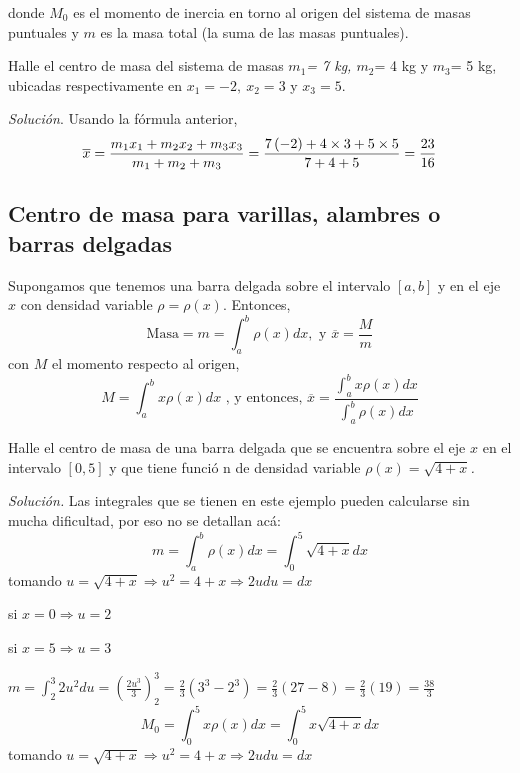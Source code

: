 donde $M_{0}$ es el momento de inercia en torno al origen del sistema de masas puntuales y $m$ es la masa total (la suma de las masas puntuales).


\begin{ejemplo} 
\textnormal{Halle el centro de masa del sistema de masas \textit{$m_{1}$= 7 kg, $m_{2}$}= 4 kg y \textit{$m_{3}$}= 5 kg, ubicadas respectivamente en \textit{$x_{1}=-2,\ x_{2}=3$} y \textit{$x_{3}=5.$}}
\end{ejemplo}


\textit{Solución}. Usando la fórmula anterior,
\[
\overline{x}=\frac{m_{1}x_{1}+m_{2}x_{2}+m_{3}x_{3}}{%
	m_{1}+m_{2}+m_{3}}=\frac{7\left( -2\right) +4\times 3+5\times 5}{7+4+5}=\frac{23}{16}
\]

\subsection*{Centro de masa para varillas, alambres o barras delgadas}

Supongamos que tenemos una barra delgada sobre el intervalo $\left[ a,b\right] $ y
en el eje $x$ con densidad variable $\rho =\rho \left( x\right) $. Entonces,
\[
\text{Masa}=m=\int_{a}^{b}\rho \left( x\right) dx,\text{ y } \overline{x}=\frac{M}{m}
\]
con $M$ el momento respecto al origen,
\[
M=\int_{a}^{b}x\rho \left( x\right) dx \text{ , y entonces, } \overline{x}=\frac{\int_{a}^{b}x\rho \left( x\right) dx}{\int_{a}^{b}\rho	\left( x\right) dx}
\]

\begin{ejemplo}
\textnormal{Halle el centro de masa de una barra delgada que se encuentra
sobre el eje \textit{$x$} en el intervalo \textit{$\left[ 0,5\right] $} y que tiene funció%
n de densidad variable \textit{$\rho \left( x\right) =\sqrt{4+x}$.}}
\end{ejemplo}

\textit{Solución.} Las integrales que se tienen en este ejemplo pueden calcularse sin mucha dificultad, por eso no se detallan acá:
\[
m=\int_{a}^{b}\rho \left( x\right) dx=\int_{0}^{5}\sqrt{4+x}dx
\]
tomando $u=\sqrt{4+x}\Rightarrow u^{2}=4+x\Rightarrow 2udu=dx$

si $x=0\Rightarrow u=2$

si $x=5\Rightarrow u=3$

$m=\int_{2}^{3}2u^{2}du=\left( \frac{2u^{3}}{3}\right) _{2}^{3}=\frac{2}{3}%
\left( 3^{3}-2^{3}\right) =\frac{2}{3}\left( 27-8\right) =\frac{2}{3}\left(
19\right) =\frac{38}{3}$
\[
M_{0}=\int_{0}^{5}x\rho \left( x\right) dx=\int_{0}^{5}x\sqrt{4+x}dx
\]
tomando $u=\sqrt{4+x}\Rightarrow u^{2}=4+x\Rightarrow 2udu=dx$

